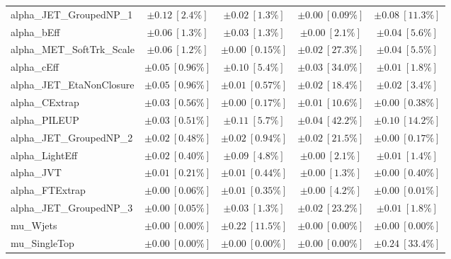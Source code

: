 \begin{sidewaystable}
\begin{center}
\begin{tabular*}{\textwidth}{@{\extracolsep{\fill}}lcccc}
alpha\_JET\_GroupedNP\_1         & $\pm 0.12\ [2.4\%] $          & $\pm 0.02\ [1.3\%] $          & $\pm 0.00\ [0.09\%] $          & $\pm 0.08\ [11.3\%] $       \\
alpha\_bEff         & $\pm 0.06\ [1.3\%] $          & $\pm 0.03\ [1.3\%] $          & $\pm 0.00\ [2.1\%] $          & $\pm 0.04\ [5.6\%] $       \\
alpha\_MET\_SoftTrk\_Scale         & $\pm 0.06\ [1.2\%] $          & $\pm 0.00\ [0.15\%] $          & $\pm 0.02\ [27.3\%] $          & $\pm 0.04\ [5.5\%] $       \\
alpha\_cEff         & $\pm 0.05\ [0.96\%] $          & $\pm 0.10\ [5.4\%] $          & $\pm 0.03\ [34.0\%] $          & $\pm 0.01\ [1.8\%] $       \\
alpha\_JET\_EtaNonClosure         & $\pm 0.05\ [0.96\%] $          & $\pm 0.01\ [0.57\%] $          & $\pm 0.02\ [18.4\%] $          & $\pm 0.02\ [3.4\%] $       \\
alpha\_CExtrap         & $\pm 0.03\ [0.56\%] $          & $\pm 0.00\ [0.17\%] $          & $\pm 0.01\ [10.6\%] $          & $\pm 0.00\ [0.38\%] $       \\
alpha\_PILEUP         & $\pm 0.03\ [0.51\%] $          & $\pm 0.11\ [5.7\%] $          & $\pm 0.04\ [42.2\%] $          & $\pm 0.10\ [14.2\%] $       \\
alpha\_JET\_GroupedNP\_2         & $\pm 0.02\ [0.48\%] $          & $\pm 0.02\ [0.94\%] $          & $\pm 0.02\ [21.5\%] $          & $\pm 0.00\ [0.17\%] $       \\
alpha\_LightEff         & $\pm 0.02\ [0.40\%] $          & $\pm 0.09\ [4.8\%] $          & $\pm 0.00\ [2.1\%] $          & $\pm 0.01\ [1.4\%] $       \\
alpha\_JVT         & $\pm 0.01\ [0.21\%] $          & $\pm 0.01\ [0.44\%] $          & $\pm 0.00\ [1.3\%] $          & $\pm 0.00\ [0.40\%] $       \\
alpha\_FTExtrap         & $\pm 0.00\ [0.06\%] $          & $\pm 0.01\ [0.35\%] $          & $\pm 0.00\ [4.2\%] $          & $\pm 0.00\ [0.01\%] $       \\
alpha\_JET\_GroupedNP\_3         & $\pm 0.00\ [0.05\%] $          & $\pm 0.03\ [1.3\%] $          & $\pm 0.02\ [23.2\%] $          & $\pm 0.01\ [1.8\%] $       \\
mu\_Wjets         & $\pm 0.00\ [0.00\%] $          & $\pm 0.22\ [11.5\%] $          & $\pm 0.00\ [0.00\%] $          & $\pm 0.00\ [0.00\%] $       \\
mu\_SingleTop         & $\pm 0.00\ [0.00\%] $          & $\pm 0.00\ [0.00\%] $          & $\pm 0.00\ [0.00\%] $          & $\pm 0.24\ [33.4\%] $       \\

\end{tabular*}
\end{center}
\end{sidewaystable}
